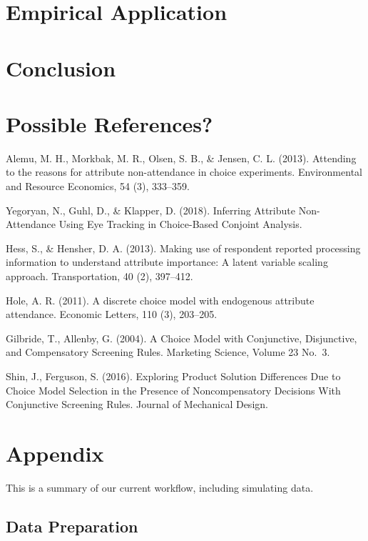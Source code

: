\documentclass[12pt,titlepage]{mktg-article}
\begin{document}
\hypertarget{empirical-application}{%
\section{Empirical Application}\label{empirical-application}}

\hypertarget{conclusion}{%
\section{Conclusion}\label{conclusion}}

\hypertarget{possible-references}{%
\section{Possible References?}\label{possible-references}}

Alemu, M. H., Morkbak, M. R., Olsen, S. B., \& Jensen, C. L. (2013). Attending to the reasons for attribute non-attendance in choice experiments. Environmental and Resource Economics, 54 (3), 333--359.

Yegoryan, N., Guhl, D., \& Klapper, D. (2018). Inferring Attribute Non-Attendance Using Eye Tracking in Choice-Based Conjoint Analysis.

Hess, S., \& Hensher, D. A. (2013). Making use of respondent reported processing information
to understand attribute importance: A latent variable scaling approach. Transportation, 40 (2), 397--412.

Hole, A. R. (2011). A discrete choice model with endogenous attribute attendance. Economic
Letters, 110 (3), 203--205.

Gilbride, T., Allenby, G. (2004). A Choice Model with Conjunctive, Disjunctive, and Compensatory Screening Rules. Marketing Science, Volume 23 No.~3.

Shin, J., Ferguson, S. (2016). Exploring Product Solution Differences Due to Choice Model Selection in the Presence of Noncompensatory Decisions With Conjunctive Screening Rules. Journal of Mechanical Design.

\hypertarget{appendix}{%
\section{Appendix}\label{appendix}}

This is a summary of our current workflow, including simulating data.

\hypertarget{data-preparation}{%
\subsection{Data Preparation}\label{data-preparation}}
\end{document}
